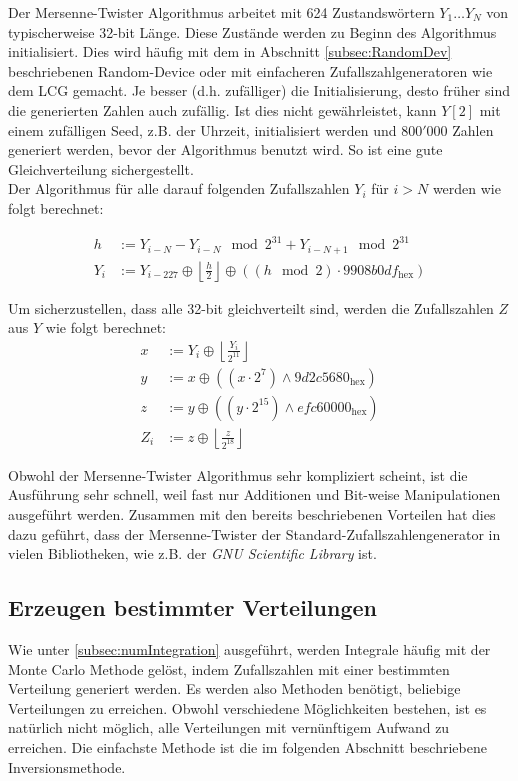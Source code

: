 \documentclass{book}
\begin{document}
\begin{refsection}
Der Mersenne-Twister Algorithmus arbeitet mit 624 Zustandswörtern $Y_1 \dots Y_N$ von typischerweise 32-bit Länge. Diese Zustände werden zu Beginn des Algorithmus initialisiert. Dies wird häufig mit dem in Abschnitt \ref{subsec:RandomDev} beschriebenen Random-Device oder mit einfacheren Zufallszahlgeneratoren wie dem LCG gemacht. Je besser (d.h. zufälliger) die Initialisierung, desto früher sind die generierten Zahlen auch zufällig. Ist dies nicht gewährleistet, kann $Y[2]$ mit einem zufälligen Seed, z.B. der Uhrzeit, initialisiert werden und $800'000$ Zahlen generiert werden, bevor der Algorithmus benutzt wird. So ist eine gute Gleichverteilung sichergestellt. \\

Der Algorithmus für alle darauf folgenden Zufallszahlen $Y_i$ für $i>N$ werden wie folgt berechnet:

\begin{align}
	h &:=  Y_{i-N} - Y_{i-N} \mod{2^{31}} + Y_{i-N+1} \mod{2^{31}} \\
	Y_i &:= Y_{i-227} \oplus \left\lfloor \frac{h}{2} \right\rfloor \oplus \left( \left(h \mod{2} \right) \cdot 9908b0df_{\text{hex}}\right)
\end{align}

Um sicherzustellen, dass alle 32-bit gleichverteilt sind, werden die Zufallszahlen $Z$ aus $Y$ wie folgt berechnet: 
\begin{align}
	x &:= Y_{i} \oplus \left\lfloor \frac{Y_i}{2^{11}} \right\rfloor \\
	y &:= x \oplus \left(\left(x \cdot 2^7\right) \wedge 9d2c5680_{\text{hex}} \right) \\
	z &:= y \oplus \left(\left(y \cdot 2^{15}\right) \wedge efc60000_{\text{hex}} \right) \\
	Z_i &:= z \oplus \left\lfloor \frac{z}{2^{18}} \right\rfloor
\end{align}

Obwohl der Mersenne-Twister Algorithmus sehr kompliziert scheint, ist die Ausführung sehr schnell, weil fast nur Additionen und Bit-weise Manipulationen ausgeführt werden. Zusammen mit den bereits beschriebenen Vorteilen hat dies dazu geführt, dass der Mersenne-Twister der Standard-Zufallszahlengenerator in vielen Bibliotheken, wie z.B. der \textit{GNU Scientific Library} ist.


\subsection{Erzeugen bestimmter Verteilungen}
Wie unter \ref{subsec:numIntegration} ausgeführt, werden Integrale häufig mit der Monte Carlo Methode gelöst, indem Zufallszahlen mit einer bestimmten Verteilung generiert werden. Es werden also Methoden benötigt, beliebige Verteilungen zu erreichen. Obwohl verschiedene Möglichkeiten bestehen, ist es natürlich nicht möglich, alle Verteilungen mit vernünftigem Aufwand zu erreichen. Die einfachste Methode ist die im folgenden Abschnitt beschriebene Inversionsmethode. 


\end{refsection}
\end{document}
